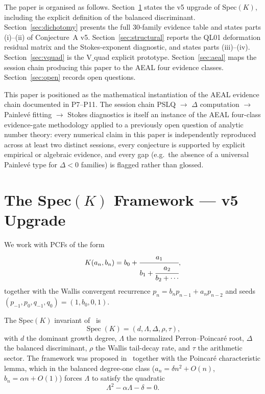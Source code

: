 \documentclass[12pt]{amsart}
\theoremstyle{definition}
\begin{document}
The paper is organised as follows.
Section~\ref{sec:speck} states the v5 upgrade of Spec$(K)$, including the
explicit definition of the balanced discriminant.
Section~\ref{sec:dichotomy} presents the full $30$-family evidence table
and states parts (i)--(ii) of Conjecture~A v5.
Section~\ref{sec:structural} reports the QL01 deformation residual matrix
and the Stokes-exponent diagnostic, and states parts (iii)--(iv).
Section~\ref{sec:vquad} is the V$\_$quad explicit prototype.
Section~\ref{sec:aeal} maps the session chain producing this paper to
the AEAL four evidence classes.
Section~\ref{sec:open} records open questions.

This paper is positioned as the mathematical instantiation of the AEAL
evidence chain documented in P7--P11. The session chain
PSLQ $\to$ $\Delta$ computation $\to$ Painlev\'e fitting $\to$ Stokes
diagnostics is itself an instance of the AEAL four-class evidence-gate
methodology applied to a previously open question of analytic number
theory: every numerical claim in this paper is independently reproduced
across at least two distinct sessions, every conjecture is supported by
explicit empirical or algebraic evidence, and every gap (e.g.\ the
absence of a universal Painlev\'e type for $\Delta<0$ families) is
flagged rather than glossed.

\section{The Spec$(K)$ Framework --- v5 Upgrade}\label{sec:speck}

We work with PCFs of the form
\[
K(a_{n},b_{n})=b_{0}+\cfrac{a_{1}}{b_{1}+\cfrac{a_{2}}{b_{2}+\cdots}},
\]
together with the Wallis convergent recurrence
$p_{n}=b_{n}p_{n-1}+a_{n}p_{n-2}$ and seeds
$(p_{-1},p_{0},q_{-1},q_{0})=(1,b_{0},0,1)$.

The Spec$(K)$ invariant of~\cite{Papanokechi2026Spec} is
\[
\operatorname{Spec}(K)=(d,\Lambda,\Delta,\rho,\tau),
\]
with $d$ the dominant growth degree, $\Lambda$ the normalized
Perron--Poincar\'e root, $\Delta$ the balanced discriminant, $\rho$ the
Wallis tail-decay rate, and $\tau$ the arithmetic sector. The framework was
proposed in~\cite{Papanokechi2026Spec} together with the
Poincar\'e characteristic lemma, which in the balanced degree-one class
($a_{n}=\delta n^{2}+O(n)$, $b_{n}=\alpha n+O(1)$) forces $\Lambda$ to
satisfy the quadratic
\begin{equation}\label{eq:poincare}
\Lambda^{2}-\alpha\Lambda-\delta=0.
\end{equation}
\end{document}
